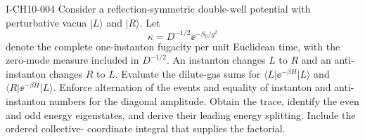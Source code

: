 \begin{exercise}{I-CH10-004}
Consider a reflection-symmetric double-well potential with perturbative vacua
$\lvert L\rangle$ and $\lvert R\rangle$.  Let
\[
  \kappa=D^{-1/2}\ee^{-S_0/g^2}
\]
denote the complete one-instanton fugacity per unit Euclidean time, with the
zero-mode measure included in $D^{-1/2}$.  An instanton changes $L$ to $R$ and
an anti-instanton changes $R$ to $L$.  Evaluate the dilute-gas sums for
$\langle L\rvert\ee^{-\beta H}\lvert L\rangle$ and
$\langle R\rvert\ee^{-\beta H}\lvert L\rangle$.  Enforce alternation of the
events and equality of instanton and anti-instanton numbers for the diagonal
amplitude.  Obtain the trace, identify the even and odd energy eigenstates,
and derive their leading energy splitting.  Include the ordered collective-
coordinate integral that supplies the factorial.
\end{exercise}
